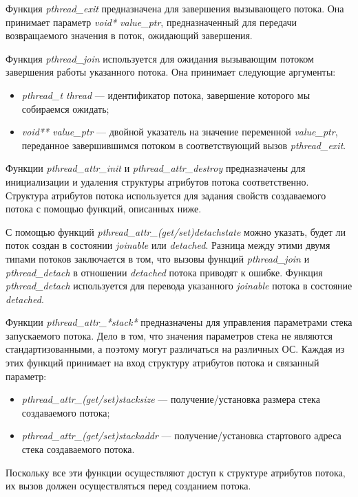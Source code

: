 Функция \textit{pthread\_exit} предназначена для завершения вызывающего потока.
Она принимает параметр \textit{void* value\_ptr}, предназначенный для передачи
возвращаемого значения в поток, ожидающий завершения.
\pagebreak

Функция \textit{pthread\_join} используется для ожидания вызывающим потоком
завершения работы указанного потока. Она принимает следующие аргументы:
\begin{itemize}
  \item \textit{pthread\_t thread} --- идентификатор потока,
    завершение которого мы собираемся ожидать;
  \item \textit{void** value\_ptr} --- двойной указатель на значение переменной
    \textit{value\_ptr}, переданное завершившимся потоком в
    соответствующий вызов \textit{pthread\_exit}.
\end{itemize}

Функции \textit{pthread\_attr\_init} и \textit{pthread\_attr\_destroy}
предназначены для инициализации и удаления структуры атрибутов
потока соответственно. Структура атрибутов потока используется для
задания свойств создаваемого потока с помощью функций, описанных ниже.

С помощью функций \textit{pthread\_attr\_(get/set)detachstate} можно указать,
будет ли поток создан в состоянии \textit{joinable} или \textit{detached}.
Разница между этими двумя типами потоков заключается в том,
что вызовы функций \textit{pthread\_join} и \textit{pthread\_detach}
в отношении \textit{detached} потока приводят к ошибке.
Функция \textit{pthread\_detach} используется для перевода указанного \textit{joinable}
потока в состояние \textit{detached}.

Функции \textit{pthread\_attr\_*stack*} предназначены для управления
параметрами стека запускаемого потока. Дело в том, что значения параметров стека
не являются стандартизованными, а поэтому могут различаться на различных ОС.
Каждая из этих функций принимает на вход структуру атрибутов потока и связанный параметр:
\begin{itemize}
  \item \textit{pthread\_attr\_(get/set)stacksize} --- получение/установка размера стека
    создаваемого потока;
  \item \textit{pthread\_attr\_(get/set)stackaddr} --- получение/установка стартового адреса
    стека создаваемого потока.
\end{itemize}

Поскольку все эти функции осуществляют доступ к структуре
атрибутов потока, их вызов должен осуществляться перед созданием потока.

